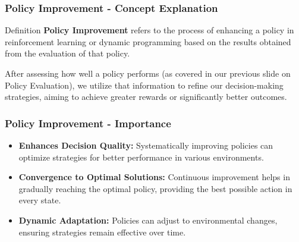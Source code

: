 \documentclass[aspectratio=169]{beamer}
\begin{document}
\begin{frame}[fragile]
    \frametitle{Policy Improvement - Concept Explanation}
    \begin{block}{Definition}
        \textbf{Policy Improvement} refers to the process of enhancing a policy in reinforcement learning or dynamic programming based on the results obtained from the evaluation of that policy. 
    \end{block}
    After assessing how well a policy performs (as covered in our previous slide on Policy Evaluation), we utilize that information to refine our decision-making strategies, aiming to achieve greater rewards or significantly better outcomes.
\end{frame}

\begin{frame}[fragile]
    \frametitle{Policy Improvement - Importance}
    \begin{itemize}
        \item \textbf{Enhances Decision Quality:} Systematically improving policies can optimize strategies for better performance in various environments.
        \item \textbf{Convergence to Optimal Solutions:} Continuous improvement helps in gradually reaching the optimal policy, providing the best possible action in every state.
        \item \textbf{Dynamic Adaptation:} Policies can adjust to environmental changes, ensuring strategies remain effective over time.
    \end{itemize}
\end{frame}
\end{document}
